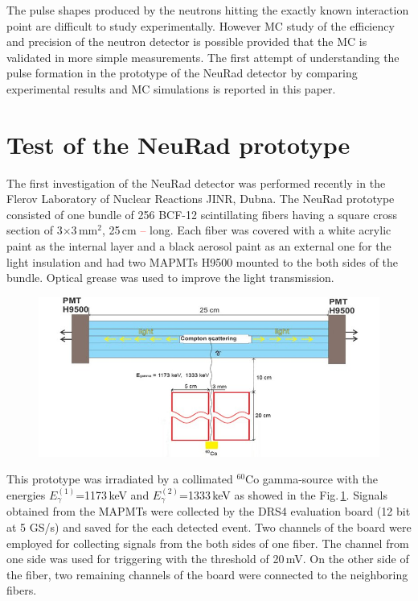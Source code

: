 \documentclass{webofc}
\newcommand{\red}[1]{\textcolor{red}{#1}}
\begin{document}
The pulse shapes produced by the neutrons hitting the exactly known interaction point are difficult to study experimentally. However MC study of the efficiency and precision of the neutron detector is possible provided that the MC is validated in more simple measurements.
The first attempt of understanding the pulse formation in the prototype of the NeuRad  detector by comparing experimental results and MC simulations is reported in this paper. 

\section{Test of the NeuRad prototype}

The first investigation of the NeuRad detector was performed recently in the Flerov Laboratory of Nuclear Reactions JINR, Dubna.
The NeuRad prototype consisted of one bundle of 256 BCF-12 \cite{crystals} scintillating fibers having a square cross section of 3$\times$3\,mm$^2$, 25\,cm \red{--} long.
Each fiber was covered with a white acrylic paint as the internal layer and a black aerosol paint as an external one for the light insulation and had two MAPMTs H9500 \cite{hm} mounted to the both sides of the bundle. Optical grease was used to improve the light transmission.

\begin{figure}[h]
	\centering
	\includegraphics[width=0.7\linewidth]{NeuRadexperiment.png}
\label{ris:neuradexp}
\end{figure}

This prototype was irradiated by a collimated $^{60}$Co gamma-source with the energies $E^{(1)}_{\gamma}$=1173\,keV and $E^{(2)}_{\gamma}$=1333\,keV as showed in the Fig.\,\ref{ris:neuradexp}. Signals obtained from the MAPMTs were collected by the DRS4 evaluation board \cite{DRS} (12 bit at 5 GS/s) and saved for the each detected event.
Two channels of the board were employed for collecting signals from the both sides of one fiber. 
The channel from one side was used for triggering with the threshold of 20\,mV.
On the other side of the fiber, two remaining channels of the board were connected to the neighboring fibers.
\end{document}
